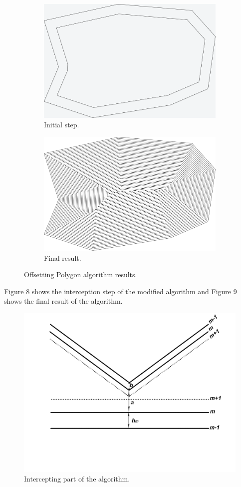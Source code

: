 \documentclass[11pt,leqno]{book}
\begin{document}
\begin{figure}[h!] 
\centering
\begin{subfigure}{.5\textwidth}
  \centering
  \includegraphics[width=.5\linewidth]{pic12.png}
  \caption{Initial step.}
  \label{fig:sub11}
\end{subfigure}
\begin{subfigure}{.5\textwidth}
  \centering
  \includegraphics[width=.5\linewidth]{pic13.png}
  \caption{Final result.}
  \label{fig:sub12}
\end{subfigure}
\caption{Offsetting Polygon algorithm results.}
\label{fig:seven}
\end{figure}
\FloatBarrier

Figure 8 shows the interception step of the modified algorithm and Figure 9 shows the final result of the algorithm.

\begin{figure}[h!]
  \centering
  \includegraphics[width=.6\linewidth]{pic15.png}
  \caption{Intercepting part of the algorithm.}
\end{figure}
\FloatBarrier
\end{document}
